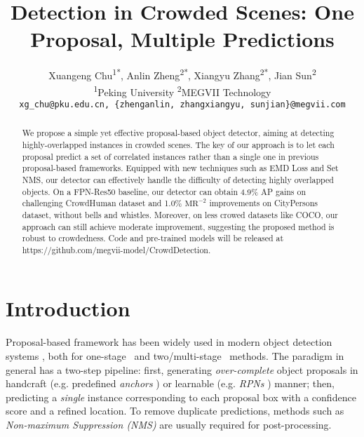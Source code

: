 \documentclass[10pt,twocolumn,letterpaper]{article}
\author{\Large 
Xuangeng Chu\textsuperscript{\rm 1*},
Anlin Zheng\textsuperscript{\rm 2*},
Xiangyu Zhang\textsuperscript{\rm 2*\dag},
Jian Sun\textsuperscript{\rm 2}\\
\textsuperscript{\rm 1}Peking University\quad
\textsuperscript{\rm 2}MEGVII Technology\\
\texttt{\small xg\_chu@pku.edu.cn, \{zhenganlin, zhangxiangyu, sunjian\}@megvii.com}\\
}
\begin{document}
\title{Detection in Crowded Scenes: One Proposal, Multiple Predictions}
\maketitle

{\let\thefootnote\relax{}}
{\let\thefootnote\relax{}}
{\let\thefootnote\relax{}}

\begin{abstract}
   We propose a simple yet effective proposal-based object detector, aiming at detecting highly-overlapped instances in crowded scenes. The key of our approach is to let each proposal predict a set of correlated instances rather than a single one in previous proposal-based frameworks. Equipped with new techniques such as EMD Loss and Set NMS, our detector can effectively handle the difficulty of detecting highly overlapped objects. On a FPN-Res50 baseline, our detector can obtain 4.9\% AP gains on challenging CrowdHuman dataset and 1.0\% $\text{MR}^{-2}$ improvements on CityPersons dataset, without bells and whistles. Moreover, on less crowed datasets like COCO, our approach can still achieve moderate improvement, suggesting the proposed method is robust to crowdedness.
   Code and pre-trained models will be released at https://github.com/megvii-model/CrowdDetection.
\end{abstract}


\section{Introduction}
\label{sec:intro}
Proposal-based framework has been widely used in modern object detection systems \cite{ren2015faster,girshick2015fast,girshick2014rich,lin2017feature,lin2017focal,liu2016ssd,he2014spatial,dai2016rfcn,dai2017deformable,cai2019cascadercnn,he2017mask,yolov3,sniper2018,snip_object}, both for one-stage~\cite{liu2016ssd,yolov3,lin2017focal,dssd} and two/multi-stage~\cite{ren2015faster,lin2017feature,dai2016rfcn,dai2017deformable,he2017mask,cai2019cascadercnn} methods. The paradigm in general has a two-step pipeline: first, generating \emph{over-complete} object proposals in handcraft (e.g. predefined \emph{anchors} \cite{yolov3,liu2016ssd,lin2017focal}) or learnable (e.g. \emph{RPNs} \cite{ren2015faster,lin2017feature,he2017mask}) manner; then, predicting a \emph{single} instance corresponding to each proposal box with a confidence score and a refined location. To remove duplicate predictions, methods such as \emph{Non-maximum Suppression (NMS)} are usually required for post-processing. 
\end{document}
